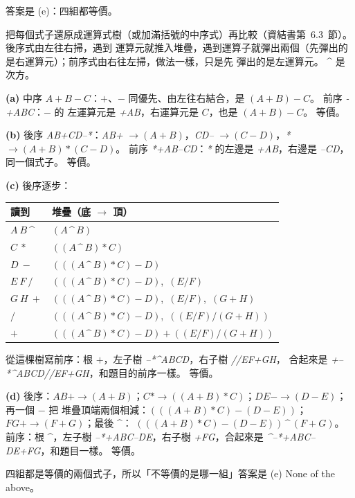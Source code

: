 \begin{pastsoln}
答案是 (e)：四組都等價。

把每個式子還原成運算式樹（或加滿括號的中序式）再比較（資結書第~6.3~節）。 後序式由左往右掃，遇到
運算元就推入堆疊，遇到運算子就彈出兩個（先彈出的是右運算元）；前序式由右往左掃，做法一樣，只是先
彈出的是左運算元。 \textasciicircum{} 是次方。

\textbf{(a)} 中序 $A + B - C$：$+$、$-$ 同優先、由左往右結合，是 $(A + B) - C$。 前序 \textit{-+ABC}：$-$ 的
左運算元是 \textit{+AB}，右運算元是 $C$，也是 $(A + B) - C$。 等價。

\textbf{(b)} 後序 \textit{AB+CD--*}：\textit{AB+} $\to (A + B)$，\textit{CD--} $\to (C - D)$，\textit{*} $\to (A + B) * (C - D)$。
前序 \textit{*+AB--CD}：\textit{*} 的左邊是 \textit{+AB}，右邊是 \textit{--CD}，同一個式子。 等價。

\textbf{(c)} 後序逐步：
\begin{center}
\small
\begin{tabular}{ll}
\toprule
讀到 & 堆疊（底 $\to$ 頂） \\
\midrule
$A\ B\ $\textasciicircum & $(A\mathbin{\text{\textasciicircum}}B)$ \\
$C\ {*}$ & $((A\mathbin{\text{\textasciicircum}}B) * C)$ \\
$D\ {-}$ & $(((A\mathbin{\text{\textasciicircum}}B) * C) - D)$ \\
$E\ F\ /$ & $(((A\mathbin{\text{\textasciicircum}}B) * C) - D)$,\ $(E / F)$ \\
$G\ H\ {+}$ & $(((A\mathbin{\text{\textasciicircum}}B) * C) - D)$,\ $(E / F)$,\ $(G + H)$ \\
$/$ & $(((A\mathbin{\text{\textasciicircum}}B) * C) - D)$,\ $((E / F) / (G + H))$ \\
${+}$ & $(((A\mathbin{\text{\textasciicircum}}B) * C) - D) + ((E / F) / (G + H))$ \\
\bottomrule
\end{tabular}
\end{center}
從這棵樹寫前序：根 $+$，左子樹 \textit{--*\textasciicircum ABCD}，右子樹 \textit{//EF+GH}，
合起來是 \textit{+--*\textasciicircum ABCD//EF+GH}，和題目的前序一樣。 等價。

\textbf{(d)} 後序：$AB{+} \to (A + B)$；$C{*} \to ((A + B) * C)$；$DE{-} \to (D - E)$；再一個 ${-}$ 把
堆疊頂端兩個相減：$(((A + B) * C) - (D - E))$；$FG{+} \to (F + G)$；最後 \textasciicircum：
$(((A + B) * C) - (D - E))\mathbin{\text{\textasciicircum}}(F + G)$。 前序：根 \textasciicircum，左子樹 \textit{--*+ABC--DE}，右子樹
\textit{+FG}，合起來是 \textit{\textasciicircum--*+ABC--DE+FG}，和題目一樣。 等價。

四組都是等價的兩個式子，所以「不等價的是哪一組」答案是 (e) None of the above。
\end{pastsoln}
